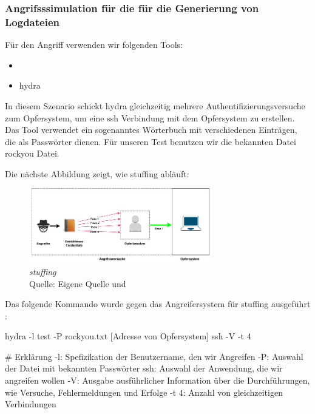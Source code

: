 \subsubsection{Angrifsssimulation für die für die Generierung von Logdateien}
Für den Angriff verwenden wir folgenden Tools:
\begin{itemize}[noitemsep]
   \item	{}
   \item \gls{hydra}
\end{itemize}

In diesem Szenario schickt \gls{hydra} gleichzeitig mehrere Authentifizierungsversuche zum Opfersystem, um eine \gls{ssh} Verbindung mit dem Opfersystem zu erstellen. Das Tool verwendet ein sogenanntes Wörterbuch mit verschiedenen Einträgen, die als Passwörter dienen. Für unseren Test benutzen wir die bekannten Datei \gls{rockyou} Datei. 

\newpage
Die nächste Abbildung zeigt, wie \gls{stuffing} abläuft:

\begin{figure}[H]
   \centering
   \includegraphics[width=0.7\textwidth]{assets/Stuffing.jpg}
   \caption{\textit{\gls{stuffing}}\\Quelle: Eigene Quelle und \citep{Nguyen_stuffing}}
   \centering
\end{figure}

Das folgende Kommando wurde gegen das Angreifersystem für \gls{stuffing} ausgeführt \citep{kali_hydra}:
{
\begin{spverbatim}
   hydra -l test -P rockyou.txt [Adresse von Opfersystem] ssh -V -t 4

   # Erklärung
   -l: Spefizikation der Benutzername, den wir Angreifen
   -P: Auswahl der Datei mit bekannten Passwörter
   ssh: Auswahl der Anwendung, die wir angreifen wollen
   -V: Ausgabe ausführlicher Information über die Durchführungen, wie Versuche, Fehlermeldungen und Erfolge
   -t 4: Anzahl von gleichzeitigen Verbindungen
\end{spverbatim}
}

